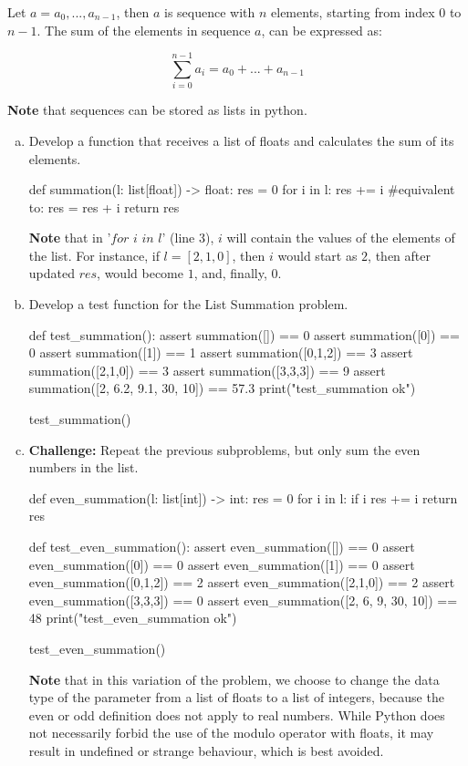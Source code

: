 \documentclass[12pt]{article}
\begin{document}
Let $a = a_{0}, ..., a_{n-1}$, then $a$ is sequence with $n$ elements, starting from
index $0$ to $n-1$. The sum of the elements in sequence $a$, can be expressed as: 

\[ \sum_{i=0}^{n-1} a_{i} = a_{0} + ... + a_{n-1} \]

\vspace{2mm}
\noindent \textbf{Note} that sequences can be stored as lists in python.
\begin{enumerate}[a)]
  \item Develop a function that receives a list of floats and calculates the
    sum of its elements.
\begin{pythonlst}
def summation(l: list[float]) -> float:
  res = 0
  for i in l:
    res += i #equivalent to: res = res + i
  return res
\end{pythonlst}
\textbf{Note} that in '$\textit{for } i \textit{ in } l$' (line 3), $i$ will 
contain the values of the elements of the list. For instance, if $l = [2, 1, 0]$, 
then $i$ would start as $2$, then after updated $res$, would become $1$, and, 
finally, $0$.
  \item Develop a test function for the List Summation problem.
  \begin{pythonlst}
def test_summation():
  assert summation([]) == 0
  assert summation([0]) == 0
  assert summation([1]) == 1
  assert summation([0,1,2]) == 3
  assert summation([2,1,0]) == 3
  assert summation([3,3,3]) == 9
  assert summation([2, 6.2, 9.1, 30, 10]) == 57.3
  print("test_summation ok")

test_summation()
  \end{pythonlst}
  \vspace{-6mm}
  \item \textbf{Challenge:} Repeat the previous subproblems, but only sum the 
    even numbers in the list. 
    \begin{pythonlst}
def even_summation(l: list[int]) -> int:
  res = 0
  for i in l:
    if i %
      res += i
  return res

def test_even_summation():
  assert even_summation([]) == 0
  assert even_summation([0]) == 0
  assert even_summation([1]) == 0
  assert even_summation([0,1,2]) == 2
  assert even_summation([2,1,0]) == 2
  assert even_summation([3,3,3]) == 0
  assert even_summation([2, 6, 9, 30, 10]) == 48
  print("test_even_summation ok")

  test_even_summation()
    \end{pythonlst}
    \vspace{-3mm}
\textbf{Note} that in this variation of the problem, we choose to change the
data type of the parameter from a list of floats to a list of integers, because 
the even or odd definition does not apply to real numbers. While Python does 
not necessarily forbid the use of the modulo operator with floats, it may result
in undefined or strange behaviour, which is best avoided.
\end{enumerate}
\end{document}
